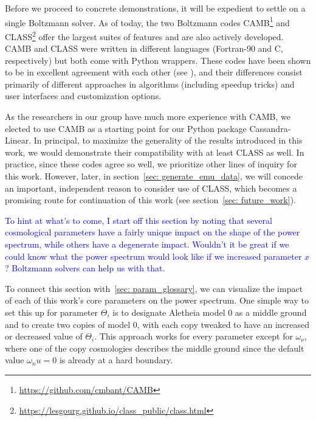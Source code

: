 
Before we proceed to concrete demonstrations, it will be expedient to settle
on a single Boltzmann solver. As of today, the two Boltzmann codes
CAMB\footnote{\url{https://github.com/cmbant/CAMB}} and
CLASS\footnote{\url{https://lesgourg.github.io/class_public/class.html}} offer
the largest suites of features and are also actively developed. CAMB and
CLASS were written in different languages (Fortran-90 and C, respectively)
but both come with Python wrappers. These codes have been shown to be in 
excellent agreement with each other (see ), and their
differences consist primarily of different approaches in algorithms (including 
speedup tricks) and user interfaces and customization options.

As the researchers in our group have much more experience with CAMB, we 
elected to use CAMB as a starting point for our Python package
Cassandra-Linear. In principal, to maximize the generality of 
the results introduced in this 
work, we would demonstrate their compatibility with at least CLASS as well. In 
practice, since these codes agree so well, we prioritize other lines of 
inquiry
for this work. However, later, in section~\ref{sec: generate_emu_data}, we 
will concede an important, 
independent reason to consider use of CLASS, which becomes a promising route
for continuation of this work (see section~\ref{sec: future_work}).

\begin{comment}
\textcolor{green}{Furthermore, the CLASS documentation
is not nearly as strong as it is with CAMB, and we already encountered
extreme difficulty simply in recreating results already previously obtained
via CAMB!}
\end{comment}


\textcolor{blue}{To hint at what's to come, I start off this section by noting that several cosmological parameters have a fairly unique impact on the shape of the power spectrum, while others have a degenerate impact. Wouldn't it be great if we could know what the power spectrum would look like if we increased parameter $x$? Boltzmann solvers can help us with that.}

To connect this section with~\ref{sec: param_glossary}, we can visualize the
impact of each of this work's core parameters on the power spectrum. One
simple way to set this up for parameter $\Theta_i$ is to designate Aletheia 
model 0 as a middle ground and to create two copies of model 0, with each
copy tweaked to have an increased or decreased value of $\Theta_i$. This
approach works for every parameter except for $\omega_\nu$, where one of the
copy cosmologies describes the middle ground since the default value
$\omega_nu = 0$ is already at a hard boundary.

